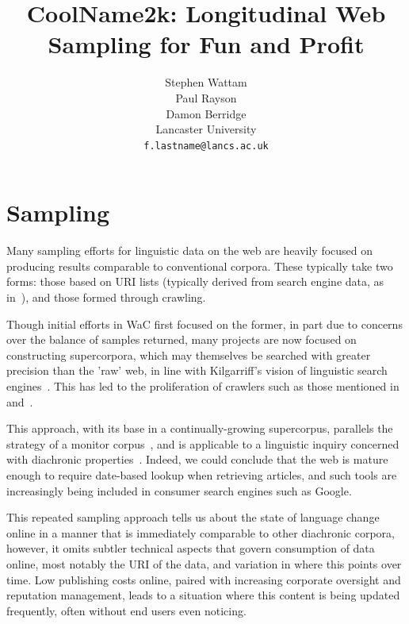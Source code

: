\documentclass[11pt]{article}
\title{CoolName2k: Longitudinal Web Sampling for Fun and Profit}
\author{Stephen Wattam \\\And
  Paul Rayson\\\And
  Damon Berridge\\\AND
  Lancaster University\\
  {\tt f.lastname@lancs.ac.uk}\\
}
\date{}
\begin{document}
\maketitle

\section{Sampling}

Many sampling efforts for linguistic data on the web are heavily focused on producing results comparable to conventional corpora.  These typically take two forms: those based on URI lists (typically derived from search engine data, as in~\cite{sharoff2006creating}), and those formed through crawling.

Though initial efforts in WaC first focused on the former, in part due to concerns over the balance of samples returned, many projects are now focused on constructing supercorpora, which may themselves be searched with greater precision than the 'raw' web, in line with Kilgarriff's vision of linguistic search engines~\cite{kilgarriff2003linguistic}.  This has led to the proliferation of crawlers such as those mentioned in~\cite{schafer8building} and~\cite{renouf2003webcorp}.


This approach, with its base in a continually-growing supercorpus, parallels the strategy of a monitor corpus~\cite{sinclair1982monitor}, and is applicable to a linguistic inquiry concerned with diachronic properties~\cite{kehoe2006diachronic}.  Indeed, we could conclude that the web is mature enough to require date-based lookup when retrieving articles, and such tools are increasingly being included in consumer search engines such as Google.

This repeated sampling approach tells us about the state of language change online in a manner that is immediately comparable to other diachronic corpora, however, it omits subtler technical aspects that govern consumption of data online, most notably the URI of the data, and variation in where this points over time.  Low publishing costs online, paired with increasing corporate oversight and reputation management, leads to a situation where this content is being updated frequently, often without end users even noticing.
\end{document}
